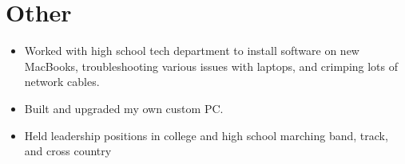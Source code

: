 \documentclass[letterpaper,11pt]{article}
\newcommand{\resumeSubHeadingListStart}{\begin{itemize}[leftmargin=*]}
\newcommand{\resumeSubHeadingListEnd}{\end{itemize}}
\begin{document}
\section{Other}
  	\resumeSubHeadingListStart
    	\item
    		{Worked with high school tech department to install software on new MacBooks, troubleshooting various issues with laptops, and crimping lots of network cables.}
    	\item
    		{Built and upgraded my own custom PC.}
    	\item
    		{Held leadership positions in college and high school marching band, track, and cross country}
  	\resumeSubHeadingListEnd

\end{document}
